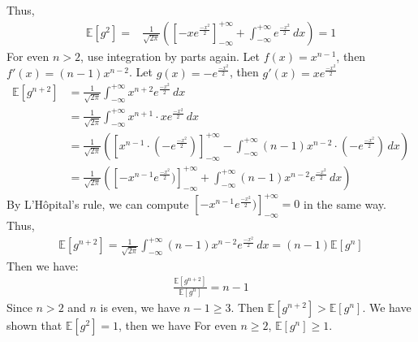 Thus,
\begin{align}
    \nonumber \mathbb{E}[g^2]=&\frac{1}{\sqrt{2\pi}}([-xe^{\frac{-x^2}{2}}]_{-\infty}^{+\infty}+\int_{-\infty }^{+\infty }e^{\frac{-x^2}{2}}\,dx )=1
\end{align}
For even $n > 2$, use integration by parts again.
Let $f(x)=x^{n-1}$, then $f'(x)=(n-1)x^{n-2}$. Let $g(x)=-e^{\frac{-x^2}{2}} $, then $g'(x)= xe^{\frac{-x^2}{2}}$
\begin{align}
    \nonumber \mathbb{E}[g^{n+2}]&=\frac{1}{\sqrt{2\pi}}\int_{-\infty }^{+\infty }x^{n+2}e^{\frac{-x^2}{2}}\,dx\\
    \nonumber &=\frac{1}{\sqrt{2\pi}}\int_{-\infty }^{+\infty }x^{n+1}\cdot x e^{\frac{-x^2}{2}}\,dx\\
    \nonumber &=\frac{1}{\sqrt{2\pi}}([x^{n-1}\cdot (-e^{\frac{-x^2}{2}})]_{-\infty}^{+\infty}-\int_{-\infty }^{+\infty }(n-1)x^{n-2}\cdot (-e^{\frac{-x^2}{2}})\,dx )\\
    \nonumber &=\frac{1}{\sqrt{2\pi}}([-x^{n-1}e^{\frac{-x^2}{2}})]_{-\infty}^{+\infty}+\int_{-\infty }^{+\infty }(n-1)x^{n-2}e^{\frac{-x^2}{2}}\,dx )
\end{align}
By L'Hôpital's rule, we can compute $[-x^{n-1}e^{\frac{-x^2}{2}})]_{-\infty}^{+\infty}=0$ in the same way.
Thus,
\begin{align}
    \nonumber \mathbb{E}[g^{n+2}]=\frac{1}{\sqrt{2\pi}}\int_{-\infty }^{+\infty }(n-1)x^{n-2}e^{\frac{-x^2}{2}}\,dx 
    =(n-1)\mathbb{E}[g^{n}]
\end{align} 
Then we have:
\begin{align}
    \nonumber \frac{\mathbb{E}[g^{n+2}]}{\mathbb{E}[g^{n}]}=n-1
\end{align}
Since $n>2$ and $n$ is even, we have $n-1\ge 3$.
Then $\mathbb{E}[g^{n+2}]>\mathbb{E}[g^{n}]$.
We have shown that $\mathbb{E}[g^{2}]=1$, then we have For even $n \ge 2$, $\mathbb{E}[g^n]\ge 1$.
